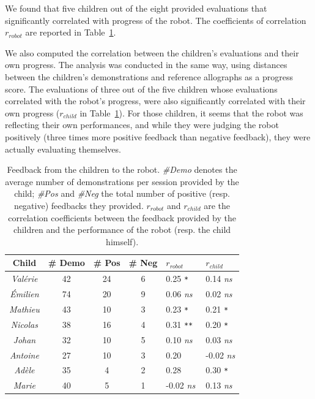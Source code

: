 \documentclass[conference]{IEEEtran}
\begin{document}
We found that five children out of the eight provided evaluations that significantly correlated with progress of the robot. The coefficients of correlation $r_{robot}$ are reported in Table~\ref{table:scores}.

We also computed the correlation between the children's evaluations and their own
progress. The analysis was conducted in the same way, using distances between the children's demonstrations and reference allographs as a progress score.
The evaluations of three out of the five children whose evaluations correlated with the robot's progress, were also significantly correlated with their own progress ($r_{child}$ in Table~\ref{table:scores}). For
those children, it seems that the robot was reflecting their own performances, and while they
were judging the robot positively (three times more positive feedback than negative feedback),
they were actually evaluating themselves.


\begin{table}
    \centering
    \caption{\footnotesize Feedback from the children to the robot. \emph{\#Demo}
        denotes the average number of demonstrations per session provided by the child;
        \emph{\#Pos} and \emph{\#Neg} the total number of positive (resp.
        negative) feedbacks they provided. $r_{robot}$ and $r_{child}$ are the correlation coefficients
        between the feedback provided by the children and the performance of the
        robot (resp. the child himself).}
    \begin{tabular}{ccccll}
        \toprule
        \bf Child      & \bf \# Demo & \bf \# Pos & \bf \# Neg & $r_{robot}$ & $r_{child}$ \\ \midrule
        \emph{Val\'erie} & 42           & 24              & 6               & 0.25 \small\tt ** & 0.14 \small\it ns\\ 
        \emph{\'Emilien} & 74           & 20              & 9               & 0.06 \small\it ns & 0.02 \small\it ns\\
        \emph{Mathieu} & 43           & 10              & 3               & 0.23 \small\tt ** & 0.21 \small\tt **\\
        \emph{Nicolas} & 38           & 16              & 4               & 0.31 \small\tt *** & 0.20 \small\tt **\\
        \emph{Johan}   & 32           & 10              & 5               & 0.10 \small\it ns & 0.03 \small\it ns\\
        \emph{Antoine} & 27           & 10              & 3               & 0.20 \small\tt * & -0.02 \small\it ns \\
        \emph{Ad\`ele}   & 35           & 4               & 2               & 0.28 \small\tt * & 0.30 \small\tt ** \\
        \emph{Marie}   & 40           & 5               & 1               & -0.02 \small\it ns & 0.13 \small\it ns\\ \bottomrule
    \end{tabular}

    \label{table:scores}
\end{table}
\end{document}
